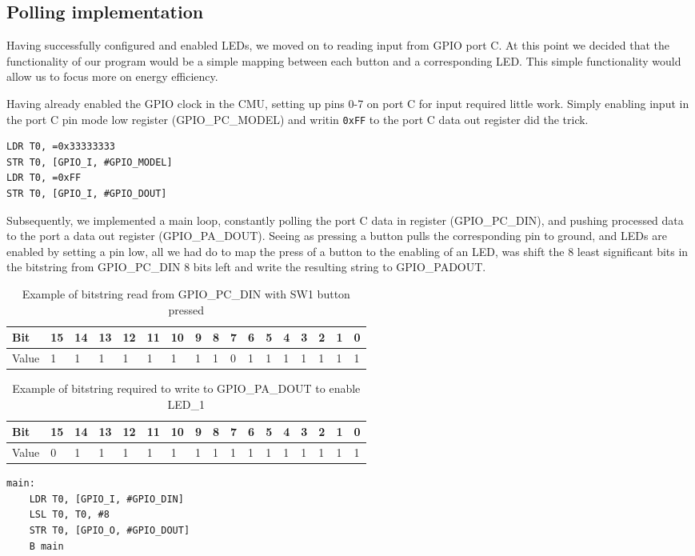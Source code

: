 \subsection{Polling implementation}
\label{sec:polling-implementation}

Having successfully configured and enabled LEDs, we moved on to reading input from GPIO port C. At this point we decided that the functionality of our program would be a simple mapping between each button and a corresponding LED. This simple functionality would allow us to focus more on energy efficiency.

\vspace{1cm}

Having already enabled the GPIO clock in the CMU, setting up pins 0-7 on port C for input required little work. Simply enabling input in the port C pin mode low register (GPIO\_PC\_MODEL) and writin \texttt{0xFF} to the port C data out register did the trick.

\begin{lstlisting}[label=enable-gpio-input, caption=Enabling input on port C]
LDR T0, =0x33333333
STR T0, [GPIO_I, #GPIO_MODEL]
LDR T0, =0xFF
STR T0, [GPIO_I, #GPIO_DOUT]
\end{lstlisting}

Subsequently, we implemented a main loop, constantly polling the port C data in register (GPIO\_PC\_DIN), and pushing processed data to the port a data out register (GPIO\_PA\_DOUT). Seeing as pressing a button pulls the corresponding pin to ground, and LEDs are enabled by setting a pin low, all we had do to map the press of a button to the enabling of an LED, was shift the 8 least significant bits in the bitstring from GPIO\_PC\_DIN 8 bits left and write the resulting string to GPIO\_PADOUT. 

\begin{table}[!h]
    \begin{tabular}{l|l|l|l|l|l|l|l|l|l|l|l|l|l|l|l|l}
    Bit   & 15 & 14 & 13 & 12 & 11 & 10 & 9 & 8 & 7 & 6 & 5 & 4 & 3 & 2 & 1 & 0 \\ \hline
    Value & 1  & 1  & 1  & 1  & 1  & 1  & 1 & 1 & 0 & 1 & 1 & 1 & 1 & 1 & 1 & 1 \\
    \end{tabular}
    \caption{Example of bitstring read from GPIO\_PC\_DIN with SW1 button pressed}
\end{table}

\begin{table}[!h]
    \begin{tabular}{l|l|l|l|l|l|l|l|l|l|l|l|l|l|l|l|l}
    Bit   & 15 & 14 & 13 & 12 & 11 & 10 & 9 & 8 & 7 & 6 & 5 & 4 & 3 & 2 & 1 & 0 \\ \hline
    Value & 0  & 1  & 1  & 1  & 1  & 1  & 1 & 1 & 1 & 1 & 1 & 1 & 1 & 1 & 1 & 1 \\
    \end{tabular}
    \caption{Example of bitstring required to write to GPIO\_PA\_DOUT to enable LED\_1}
\end{table}


\newpage

\begin{lstlisting}[label=main-polling-loop, caption=Main loop]
main:
    LDR T0, [GPIO_I, #GPIO_DIN]
    LSL T0, T0, #8
    STR T0, [GPIO_O, #GPIO_DOUT]
    B main
\end{lstlisting}
